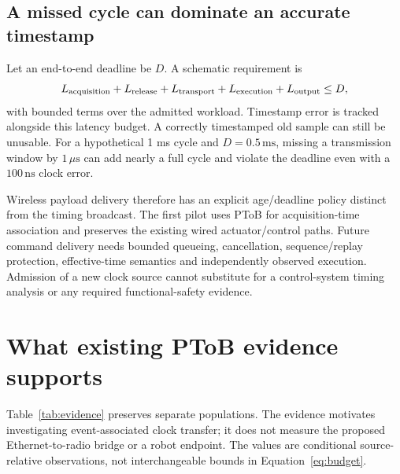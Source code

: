 \documentclass[11pt,letterpaper]{article}
\newcommand{\ns}{\,\mathrm{ns}}\newcommand{\us}{\,\mu\mathrm{s}}\newcommand{\ms}{\,\mathrm{ms}}\newcommand{\ppm}{\,\mathrm{ppm}}
\begin{document}
\subsection{A missed cycle can dominate an accurate timestamp}
Let an end-to-end deadline be $D$. A schematic requirement is
\begin{equation}
 L_{\rm acquisition}+L_{\rm release}+L_{\rm transport}
 +L_{\rm execution}+L_{\rm output}\leq D,
 \label{eq:deadline}
\end{equation}
with bounded terms over the admitted workload. Timestamp error is tracked alongside this latency budget. A correctly timestamped old sample can still be unusable. For a hypothetical 1 ms cycle and $D=0.5\ms$, missing a transmission window by $1\us$ can add nearly a full cycle and violate the deadline even with a $100\ns$ clock error.

Wireless payload delivery therefore has an explicit age/deadline policy distinct from the timing broadcast. The first pilot uses PToB for acquisition-time association and preserves the existing wired actuator/control paths. Future command delivery needs bounded queueing, cancellation, sequence/replay protection, effective-time semantics and independently observed execution. Admission of a new clock source cannot substitute for a control-system timing analysis or any required functional-safety evidence.

\section{What existing PToB evidence supports}\label{sec:evidence}
Table~\ref{tab:evidence} preserves separate populations. The evidence motivates investigating event-associated clock transfer; it does not measure the proposed Ethernet-to-radio bridge or a robot endpoint. The values are conditional source-relative observations, not interchangeable bounds in Equation~\ref{eq:budget}.
\end{document}
